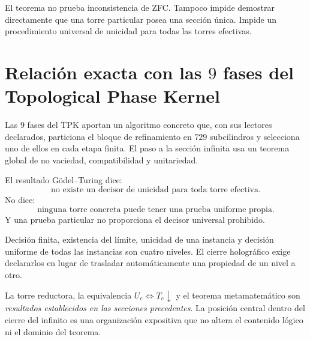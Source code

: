 \begin{remark}
El teorema no prueba inconsistencia de ZFC. Tampoco impide demostrar
directamente que una torre particular posea una sección única. Impide un
procedimiento universal de unicidad para todas las torres efectivas.
\end{remark}

\section{Relación exacta con las \(9\) fases del Topological Phase Kernel}

Las \(9\) fases del TPK aportan un algoritmo concreto que, con sus lectores declarados,
particiona el bloque de refinamiento en \(729\) subcilindros y selecciona uno de ellos
en cada etapa finita.
El paso a la sección infinita usa un teorema global de no vaciedad,
compatibilidad y unitariedad.

El resultado Gödel--Turing dice:
\[
\text{no existe un decisor de unicidad para toda torre efectiva}.
\]
No dice:
\[
\text{ninguna torre concreta puede tener una prueba uniforme propia}.
\]
Y una prueba particular no proporciona el decisor universal prohibido.

\enlargethispage{5\baselineskip}
\begin{remark}
Decisión finita, existencia del límite, unicidad de una instancia y decisión
uniforme de todas las instancias son cuatro niveles. El cierre holográfico
exige declararlos en lugar de trasladar automáticamente una propiedad de un
nivel a otro.
\end{remark}

\begin{remark}
La torre reductora, la equivalencia \(U_e\iff T_e\downarrow\) y el teorema
metamatemático son \emph{resultados establecidos en las secciones precedentes}. La posición central dentro
del cierre del infinito es una organización expositiva que no altera el contenido lógico ni el dominio del teorema.
\end{remark}
